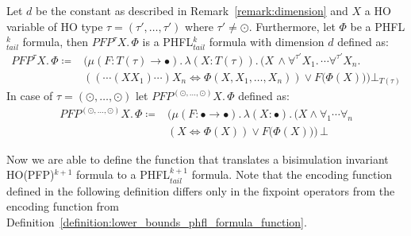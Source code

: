 \begin{definition}
Let $d$ be the constant as described in Remark~\ref{remark:dimension} and $X$ a HO variable of HO type $\tau = (\tau', \dots, \tau')$ where $\tau' \neq \odot$. Furthermore, let
    $\Phi$ be a PHFL$^k_{tail}$
    formula, then $PFP^\tau X.\,\Phi$
    is a PHFL$^k_{tail}$ formula with dimension $d$ defined as:
    \begin{align*}
     PFP^\tau X. \, \Phi \coloneqq &\Big(\mu (F \colon T(\tau) \rightarrow \bullet).\,\lambda (X \colon T(\tau)).\, \big(X\,\wedge \forall^{\tau'}X_1.\, \dotsb \forall^{\tau'}X_n.\, \\&( (\dotsb (X X_1) \dotsb) X_n \Leftrightarrow \Phi(X, X_1, \dots, X_n) ) \vee F(\Phi(X)\big)\Big)\bot_{T(\tau)}
\end{align*}    
    In case of $\tau = (\odot, \dots, \odot)$ let $PFP^{(\odot, \dots, \odot)} X.\,\Phi$ defined as:
    \begin{align*}
    PFP^{(\odot, \dots, \odot)} X.\,\Phi \coloneqq & \Big(\mu (F \colon \bullet \rightarrow \bullet).\,\lambda (X \colon \bullet).\, \big(X \wedge \forall_1 \dotsb \forall_n \\&(X \Leftrightarrow \Phi(X)) \vee F(\Phi(X)\big)\Big)\,\bot 
    \end{align*}
\end{definition}

Now we are able to define the function that translates a bisimulation invariant HO(PFP)$^{k+1}$
formula to a PHFL$^{k+1}_{tail}$ formula. Note that the encoding function defined in the following definition differs only in the fixpoint operators from the encoding function from Definition~\ref{definition:lower_bounds_phfl_formula_function}.


